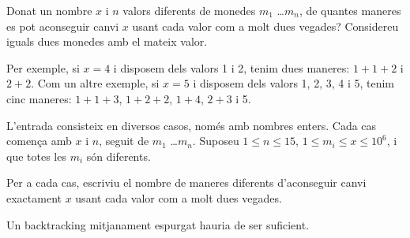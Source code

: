 

\Statement

Donat un nombre $x$ i $n$ valors diferents de monedes $m_1$ \dots $m_n$,
de quantes maneres es pot aconseguir canvi $x$
usant cada valor com a molt dues vegades?
Considereu iguals dues monedes amb el mateix valor.

\medskip

Per exemple, si $x = 4$ i disposem dels valors 1 i 2,
tenim dues maneres: $1 + 1 + 2$ i $2 + 2$.
Com un altre exemple,
si $x = 5$ i disposem dels valors 1, 2, 3, 4 i 5,
tenim cinc maneres:
$1 + 1 + 3$,
$1 + 2 + 2$,
$1 + 4$,
$2 + 3$
i 5.


\Input

L'entrada consisteix en diversos casos, només amb nombres enters.
Cada cas comença amb $x$ i $n$, seguit de $m_1$ \dots $m_n$.
Suposeu $1 \le n \le 15$,
$1 \le m_i \le x \le 10^6$,
i que totes les $m_i$ són diferents.


\Output

Per a cada cas,
escriviu el nombre de maneres diferents d'aconseguir canvi exactament $x$
usant cada valor com a molt dues vegades.


\Hint

Un backtracking mitjanament espurgat hauria de ser suficient.


\Sample

